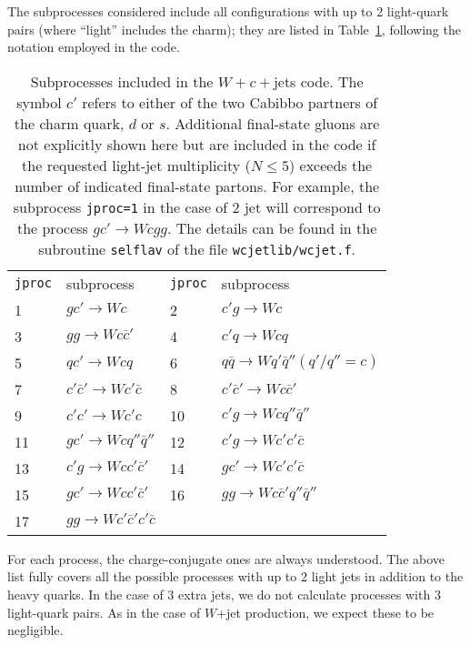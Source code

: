 \documentclass[paper]{JHEP3}
\newcommand{\ccaption}[2]{
    \begin{center}
    \parbox{0.85\textwidth}{
      \caption[#1]{\small{{#2}}}
      }
    \end{center}
    }
\def    \qbar   {\bar{q}}
\def    \cbar   {\bar{c}}
\def    \cpbar   {\bar{c}'}
\begin{document}
The subprocesses considered include all configurations
with up to 2 light-quark pairs (where ``light'' includes the charm); 
they are listed in
Table~\ref{tab:wcjets}, following the notation employed in the
code.
\begin{table}
\begin{center}
\begin{tabular}{ll|ll}
{\tt jproc} & subprocess & {\tt jproc} & subprocess \\ 
1 &  $g c' \to W c  $ 
&2 &  $c' g \to W c  $ 
\\
3 &  $gg \to W c \cbar'  $ 
&4 &  $c'q \to W  c q $ 
\\
5 &  $q c' \to W  c q $ 
&6 &  $q\qbar \to W  q' \qbar'' (q'/q''=c) $
\\
7 &  $c' \cbar' \to W  c' \bar{c} $ 
&8 &  $c'\cbar' \to W  c \cbar' $ 
\\
9 &  $c' c' \to W  c' c$ 
&10 &  $c' g \to W  c q''\qbar'' $ 
\\
11 &  $g c' \to W  c q''\qbar'' $ 
&12 &  $c' g \to W  c' c' \cbar $ 
\\
13 &  $c' g \to W  c c' \cpbar $ 
&14 &  $g c' \to W  c' c' \cbar $ 
\\
15 &  $g c' \to W  c c' \cpbar $ 
&16 &  $g g \to W  c \cbar' q'' \qbar'' $ 
\\
17 &  $g g \to W  c' \cpbar c' \cbar $ 
& &
\end{tabular}
\ccaption{}{\label{tab:wcjets} Subprocesses included in the $W+c+$jets
  code. The symbol $c'$ refers to either of the two Cabibbo partners
  of the charm quark, $d$ or $s$.
  Additional final-state gluons are not explicitly 
  shown here but are included in the code if the requested light-jet
  multiplicity ($N\le 5$) exceeds the number of indicated final-state partons.
  For example, the subprocess {\tt jproc=1} in the case of 2 jet
  will correspond to the process  $g c' \to W c g g$.
  The details can be found in the subroutine {\tt selflav} of
  the file {\tt wcjetlib/wcjet.f}.}
\end{center}
\end{table}
For each process, the charge-conjugate ones are always understood.
The above list fully covers all the possible processes with up to 2
light jets in addition to the heavy quarks. In the case of 3 extra
jets, we do not calculate processes with 3 light-quark pairs. As in
the case of $W$+jet production, we expect these to be negligible.
\end{document}
